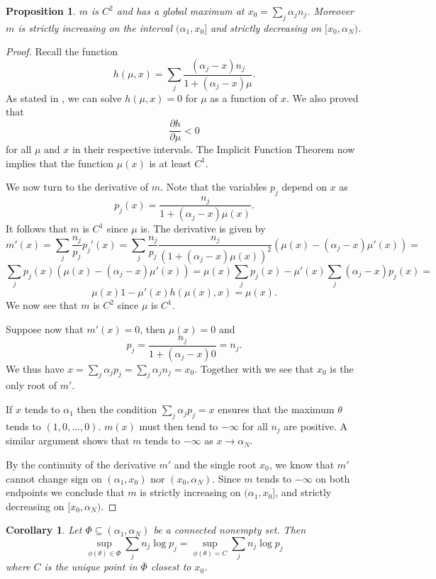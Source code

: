 \documentclass{article}
\theoremstyle{plain}
\newtheorem{proposition} {\bf Proposition} [section]
\newtheorem{corollary}   {\bf Corollary}   [section]
\theoremstyle{definition}
\begin{document}
\begin{proposition}
	$m$ is $C^2$ and has a global maximum at $x_0=\sum_j\alpha_jn_j$. 
	Moreover $m$ is strictly increasing on the interval $(\alpha_1,x_0]$
	and strictly decreasing on $[x_0,\alpha_N)$.
\end{proposition}
\begin{proof}
	Recall the function $$h(\mu,x)=\sum_j\frac{(\alpha_j-x)n_j}
	{1+(\alpha_j-x)\mu}.$$ As stated in , we can solve $h(\mu,x)=0$ for
	$\mu$ as a function of
	$x$. We also proved that $$\frac{\partial h}{\partial\mu}<0$$ for all $\mu$ and
	$x$ in their respective intervals. The Implicit Function Theorem now implies that
	the function $\mu(x)$ is at least $C^1$.

	We now turn to the derivative of $m$. Note that the variables $p_j$ depend on $x$ as
	$$p_j(x)=\frac{n_j}{1+(\alpha_j-x)\mu(x)}.$$ It follows that $m$ is $C^1$ since $\mu$ is.
	The derivative is given by $$m'(x)=\sum_j\frac{n_j}{p_j}p_j'(x)=\sum_j
	\frac{n_j}{p_j}\frac{n_j}{(1+(\alpha_j-x)\mu(x))^2}(\mu(x)-(\alpha_j-x)\mu'(x))=$$$$
	\sum_jp_j(x)(\mu(x)-(\alpha_j-x)\mu'(x))=
	\mu(x)\sum_jp_j(x)-\mu'(x)\sum_j(\alpha_j-x)p_j(x)=$$$$
	\mu(x)1-\mu'(x)h(\mu(x),x)=\mu(x).$$
	We now see that $m$ is $C^2$ since $\mu$ is $C^1$.

	Suppose now that $m'(x)=0$, then $\mu(x)=0$ and $$p_j=\frac{n_j}{1+(\alpha_j-x)0}=n_j.$$
	We thus have $x=\sum_j\alpha_jp_j=\sum_j\alpha_jn_j=x_0$. Together with  we
	see that $x_0$ is the only root of $m'$.

	If $x$ tends to $\alpha_1$ then the condition $\sum_j\alpha_jp_j=x$ ensures that the maximum
	$\theta$ tends to $(1,0,...,0)$. $m(x)$ must then tend to $-\infty$ for all $n_j$ are positive.
	A similar argument shows that $m$ tends to $-\infty$ as $x\to\alpha_N$.

	By the continuity of the derivative $m'$ and the single root $x_0$, we know that $m'$ cannot
	change sign on $(\alpha_1,x_0)$ nor $(x_0,\alpha_N)$. Since $m$ tends to $-\infty$ on both
	endpoints we conclude that $m$ is strictly increasing on $(\alpha_1,x_0]$, and strictly
	decreasing on $[x_0,\alpha_N)$.
\end{proof}

\begin{corollary}
	Let $\Phi\subseteq(\alpha_1,\alpha_N)$ be a connected nonempty set. Then
	$$\sup_{\phi(\theta)\in\Phi}\sum_jn_j\log p_j=\sup_{\phi(\theta)=C}\sum_jn_j\log p_j$$
	where $C$ is the unique point in $\overline{\Phi}$ closest to $x_0$.
\end{corollary}
\end{document}

